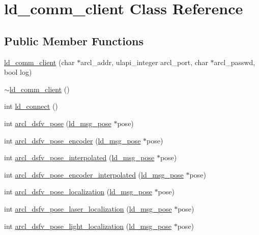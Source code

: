 \hypertarget{classld__comm__client}{}\section{ld\+\_\+comm\+\_\+client Class Reference}
\label{classld__comm__client}
\subsection*{Public Member Functions}
\begin{DoxyCompactItemize}
\item 
\hyperlink{classld__comm__client_abc88de149791710a26470a290de031ef}{ld\+\_\+comm\+\_\+client} (char $\ast$arcl\+\_\+addr, ulapi\+\_\+integer arcl\+\_\+port, char $\ast$arcl\+\_\+passwd, bool log)
\item 
\hyperlink{classld__comm__client_a08a4beffb5099ba02edd0acbbcf16187}{$\sim$ld\+\_\+comm\+\_\+client} ()
\item 
int \hyperlink{classld__comm__client_a254638599da673cf2f376166a8f9b984}{ld\+\_\+connect} ()
\item 
int \hyperlink{classld__comm__client_a9dfef26a96307abc124c780148b2fdd1}{arcl\+\_\+dsfv\+\_\+pose} (\hyperlink{structld__msg__pose}{ld\+\_\+msg\+\_\+pose} $\ast$pose)
\item 
int \hyperlink{classld__comm__client_a8fe145161e824738ccd351c5533b9d1e}{arcl\+\_\+dsfv\+\_\+pose\+\_\+encoder} (\hyperlink{structld__msg__pose}{ld\+\_\+msg\+\_\+pose} $\ast$pose)
\item 
int \hyperlink{classld__comm__client_a1cbdd2fcd2ea8d7d4072c3953ce5f11d}{arcl\+\_\+dsfv\+\_\+pose\+\_\+interpolated} (\hyperlink{structld__msg__pose}{ld\+\_\+msg\+\_\+pose} $\ast$pose)
\item 
int \hyperlink{classld__comm__client_a0b983bc131cfc619e8ab8785daef32e8}{arcl\+\_\+dsfv\+\_\+pose\+\_\+encoder\+\_\+interpolated} (\hyperlink{structld__msg__pose}{ld\+\_\+msg\+\_\+pose} $\ast$pose)
\item 
int \hyperlink{classld__comm__client_a9c0159e1ab1f6112e4ee9e14e2ae4975}{arcl\+\_\+dsfv\+\_\+pose\+\_\+localization} (\hyperlink{structld__msg__pose}{ld\+\_\+msg\+\_\+pose} $\ast$pose)
\item 
int \hyperlink{classld__comm__client_ac1520245a4281887fc5442933d519bf9}{arcl\+\_\+dsfv\+\_\+pose\+\_\+laser\+\_\+localization} (\hyperlink{structld__msg__pose}{ld\+\_\+msg\+\_\+pose} $\ast$pose)
\item 
int \hyperlink{classld__comm__client_a513a0bddf7967271eb3ba45d50f47fe6}{arcl\+\_\+dsfv\+\_\+pose\+\_\+light\+\_\+localization} (\hyperlink{structld__msg__pose}{ld\+\_\+msg\+\_\+pose} $\ast$pose)

\end{DoxyCompactItemize}
